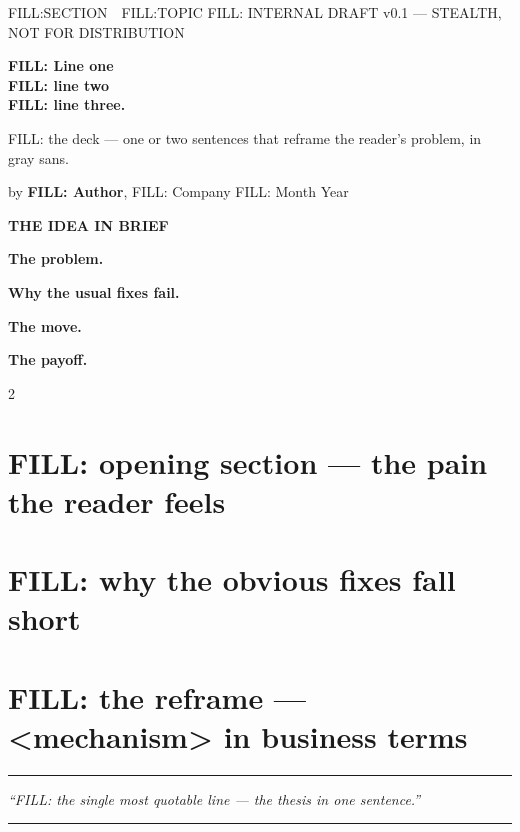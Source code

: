 \documentclass[10pt]{article}
\newcommand{\dek}[1]{{\large\sffamily\color{hbrgray} #1\par}}
\newenvironment{ideabrief}
  {\begin{mdframed}[backgroundcolor=hbrbg,linecolor=hbrred,linewidth=2pt,
    topline=false,bottomline=false,rightline=false,
    innerleftmargin=10pt,innerrightmargin=10pt,innertopmargin=8pt,innerbottommargin=8pt]
   \sffamily\small}
  {\end{mdframed}}
\newcommand{\pullquote}[1]{%
  \par\vspace{6pt}
  {\noindent\color{hbrred}\rule{\linewidth}{0.6pt}}\par\vspace{4pt}
  {\noindent\large\sffamily\itshape\color{hbrred} ``#1''}\par\vspace{4pt}
  {\noindent\color{hbrred}\rule{\linewidth}{0.6pt}}\par\vspace{6pt}}
\begin{document}
{\sffamily\footnotesize\color{hbrred} FILL:SECTION \,\textbullet\, FILL:TOPIC \hfill FILL: INTERNAL DRAFT v0.1 --- STEALTH, NOT FOR DISTRIBUTION}

\vspace{4mm}
{\Huge\sffamily\bfseries\color{hbrdark} FILL: Line one\\ FILL: line two\\ FILL: line three.\par}

\vspace{3mm}
\dek{FILL: the deck — one or two sentences that reframe the reader's problem, in gray sans.}

\vspace{2mm}
{\sffamily\small by \textbf{FILL: Author}, FILL: Company \hfill FILL: Month Year}

\vspace{4mm}
\begin{ideabrief}
\textbf{THE IDEA IN BRIEF}

\textbf{The problem.} %

\textbf{Why the usual fixes fail.} %

\textbf{The move.} %

\textbf{The payoff.} %
\end{ideabrief}

\vspace{3mm}
\begin{multicols}{2}

\section*{FILL: opening section — the pain the reader feels}

\section*{FILL: why the obvious fixes fall short}

\section*{FILL: the reframe — <mechanism> in business terms}

\pullquote{FILL: the single most quotable line — the thesis in one sentence.}


\end{multicols}
\end{document}
